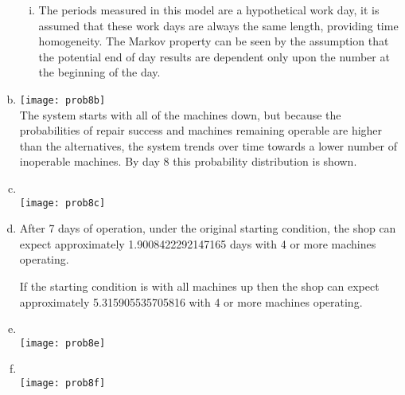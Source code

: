 \documentclass[answers]{exam}
\begin{document}
\begin{questions}
\begin{solution}
\begin{enumerate}[(a)]
\begin{enumerate}[i.]
			\item 
			The periods measured in this model are a hypothetical work day, 
			it is assumed that these work days are always the same length,
			providing time homogeneity.
			The Markov property can be seen by the assumption that the potential end of day results
			are dependent only upon the number at the beginning of the day.
		\end{enumerate}
	
		\item 
		\texttt{[image: prob8b]} \\	
		The system starts with all of the machines down,
		but because the probabilities of repair success and machines remaining operable are higher than the alternatives,
		the system trends over time towards a lower number of inoperable machines.
		By day 8 this probability distribution is shown.
		
		\item 
		\phantom{c}\\
		\texttt{[image: prob8c]}
		
		\item 
		After 7 days of operation, under the original starting condition, the shop can expect 
		approximately 1.9008422292147165 days with 4 or more machines operating.
		
		If the starting condition is with all machines up then the shop can expect
		approximately 5.315905535705816  with 4 or more machines operating.
		
		\item
		\phantom{e}\\ 
		\texttt{[image: prob8e]}

		\item 
		\phantom{f}\\
		\texttt{[image: prob8f]}

	\end{enumerate}
\end{solution}



\end{questions}
\end{document}
